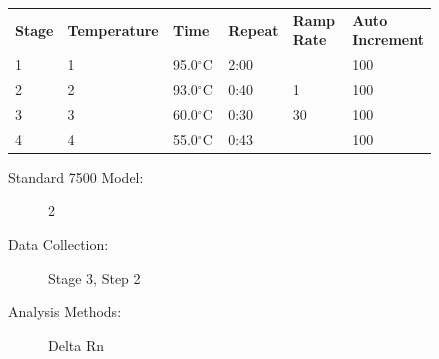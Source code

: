 \documentclass[UTF8,10pt,a4paper,fontset=fandol]{ctexart}
\newcommand{\fieldvalue}[1]{#1}
\begin{document}
\small
\begin{tabular}{p{0.08\linewidth}p{0.16\linewidth}p{0.13\linewidth}p{0.13\linewidth}p{0.14\linewidth}p{0.20\linewidth}}
\textbf{Stage} & \textbf{Temperature} & \textbf{Time} & \textbf{Repeat} & \textbf{Ramp Rate} & \textbf{Auto Increment} \\
1 &
\fieldvalue{1} &
\fieldvalue{95.0$^\circ$C} &
\fieldvalue{2:00} &
 &
\fieldvalue{100} &
 \\
2 &
\fieldvalue{2} &
\fieldvalue{93.0$^\circ$C} &
\fieldvalue{0:40} &
\fieldvalue{1} &
\fieldvalue{100} &
 \\
3 &
\fieldvalue{3} &
\fieldvalue{60.0$^\circ$C} &
\fieldvalue{0:30} &
\fieldvalue{30} &
\fieldvalue{100} &
 \\
4 &
\fieldvalue{4} &
\fieldvalue{55.0$^\circ$C} &
\fieldvalue{0:43} &
 &
\fieldvalue{100} &
 \\
\end{tabular}
\normalsize

\begin{description}
\item[Standard 7500 Model:] %
\fieldvalue{2}

\item[Data Collection:] %
\fieldvalue{Stage 3, Step 2}

\item[Analysis Methods:] %
\fieldvalue{Delta Rn}
\end{description}
\end{document}

